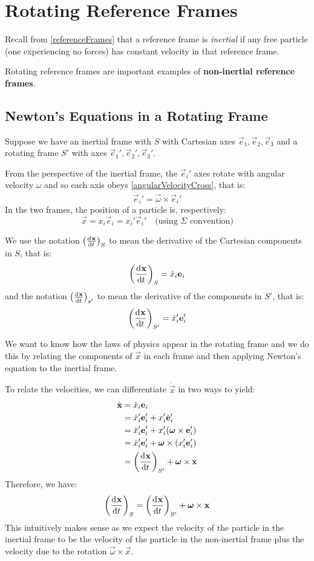 \documentclass[../main.tex]{subfiles}
\begin{document}
\chapter{Rotating Reference Frames}
\begin{remark}[Recap]
  Recall from \cref{referenceFrames} that a reference frame is \textit{inertial} if any free particle (one experiencing no forces) has constant velocity in that reference frame.
\end{remark}
Rotating reference frames are important examples of \textbf{non-inertial reference frames}.
\section{Newton's Equations in a Rotating Frame}
Suppose we have an inertial frame with $S$ with Cartesian axes $\vec{e}_1, \vec{e}_2, \vec{e}_3$ and a rotating frame $S'$ with axes $\vec{e}_1', \vec{e}_2', \vec{e}_3'$.

From the perspective of the inertial frame, the $\vec{e}_i'$ axes rotate with angular velocity $\omega$ and so each axis obeys \cref{angularVelocityCross}, that is:
\[
  \dot{\vec{e}}_i' = \vec{\omega} \times \vec{e}_i'
\]
In the two frames, the position of a particle is, respectively:
\[
  \vec{x} = x_i \vec{e}_i = x_i' \vec{e}_i' \quad \text{(using $\Sigma$ convention)}
\]
\begin{remark}[Notation]
  We use the notation $\left(\deriv{\vec{x}}{t}\right)_S$ to mean the derivative of the Cartesian components in $S$, that is:
  \[
    \left(\deriv{\vec{x}}{t}\right)_S = \dot{x}_i \vec{e}_i
  \]
  and the notation $\left(\deriv{\vec{x}}{t}\right)_{s'}$ to mean the derivative of the components in $S'$, that is:
  \[
    \left(\deriv{\vec{x}}{t}\right)_{S'} = \dot{x}'_i \vec{e}_i'
  \]
\end{remark}
We want to know how the laws of physics appear in the rotating frame and we do this by relating the components of $\vec{x}$ in each frame and then applying Newton's equation to the inertial frame.

To relate the velocities, we can differentiate $\dot{\vec{x}}$ in two ways to yield:
\begin{align*}
  \dot{\vec{x}} &= \dot{x}_i \vec{e}_i \\
                &= \dot{x}_i' \vec{e}_i' + x_i' \dot{\vec{e}}_i' \\
                &= \dot{x}_i' \vec{e}_i' + x_i' (\vec{\omega} \times \vec{e}_i') \\
                &= \dot{x}_i' \vec{e}_i' + \vec{\omega} \times (x_i' \vec{e}_i') \\
                &= \left(\deriv{\vec{x}}{t}\right)_{S'} + \vec{\omega} \times \vec{x}
\end{align*}
Therefore, we have:
\[
  \left(\deriv{\vec{x}}{t}\right)_{S} = \left(\deriv{\vec{x}}{t}\right)_{S'} + \vec{\omega} \times \vec{x}
\]
This intuitively makes sense as we expect the velocity of the particle in the inertial frame to be the velocity of the particle in the non-inertial frame plus the velocity due to the rotation $\vec{\omega} \times \vec{x}$.
\end{document}
